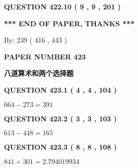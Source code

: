 \documentclass{ctexart}
\begin{document}
{\textbf{\Large{QUESTION
422.10 
 ( 9 , 9 , 201 )
}}}
  
  
   
   
 \vspace{0.2in}
 
   
   
   
   
\vspace{1.0in} 
{\textbf{\large{ *** END OF PAPER, THANKS *** }}} 
   
   
\hspace{1.0in} By: 
 239 ( 416 ,  443 )
   
   
   
   
\newpage 
\setcounter{page}{ 
   423001 } 
   
   
   
   
 {\textbf{ \Large{ PAPER NUMBER  423  }}}
   
   
\vspace{0.2in}
   
   
   
   
   
   
 \vspace{0.2in}
{\LARGE {\textbf{ 八道算术和两个选择题}}}
   
   
  
\vspace{0.2in}
  
{\textbf{\Large{QUESTION
423.1 
 ( 4 , 4 , 104 )
}}}
  
  
 
 

$ %
664 -  %
273=   %
391$
 
 
  
\vspace{0.2in}
  
{\textbf{\Large{QUESTION
423.2 
 ( 3 , 3 , 103 )
}}}
  
  
 
 

$ %
613 -  %
448=   %
165$
 
 
  
\vspace{0.2in}
  
{\textbf{\Large{QUESTION
423.3 
 ( 8 , 8 , 108 )
}}}
  
  
 
 

$ %
841 \div  %
301=   %
2.794019934$
 
\end{document}
